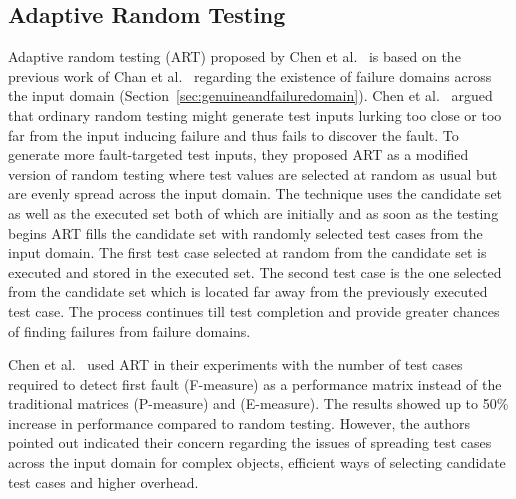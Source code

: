 \subsection{Adaptive Random Testing}
\label{sec:artpatterns_2}
Adaptive random testing (ART) proposed by Chen et al.~\cite{chen2005adaptive} is based on the previous work of Chan et al.~\cite{chan1996proportional} regarding the existence of failure domains across the input domain (Section~\ref{sec:genuineandfailuredomain}). Chen et al.~\cite{chen2005adaptive} argued that ordinary random testing might generate test inputs lurking too close or too far from the input inducing failure and thus fails to discover the fault. To generate more fault-targeted test inputs, they proposed ART as a modified version of random testing where test values are selected at random as usual but are evenly spread across the input domain.  The technique uses the candidate set as well as the executed set both of which are initially and as soon as the testing begins ART fills the candidate set with randomly selected test cases from the input domain. The first test case selected at random from the candidate set is executed and stored in the executed set. The second test case is the one selected from the candidate set which is located far away from the previously executed test case. The process continues till test completion and provide greater chances of finding failures from failure domains.

Chen et al.~\cite{chen2005adaptive} used ART in their experiments with the number of test cases required to detect first fault (F-measure) as a performance matrix instead of the traditional matrices (P-measure) and (E-measure). The results showed up to 50\% increase in performance compared to random testing. However, the authors pointed out indicated their concern regarding the issues of spreading test cases across the input domain for complex objects, efficient ways of selecting candidate test cases and higher overhead. %

